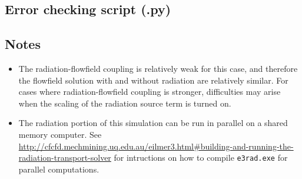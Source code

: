 \subsection{Error checking script (.py)}
\topbar

\bottombar

\subsection{Notes}

\begin{itemize}
 \item The radiation-flowfield coupling is relatively weak for this case, and therefore the flowfield solution with and without radiation are relatively similar.
For cases where radiation-flowfield coupling is stronger, difficulties may arise when the scaling of the radiation source term is turned on.
 \item The radiation portion of this simulation can be run in parallel on a shared memory computer.  See \url{http://cfcfd.mechmining.uq.edu.au/eilmer3.html#building-and-running-the-radiation-transport-solver} for intructions on how to compile \texttt{e3rad.exe} for parallel computations.
\end{itemize}